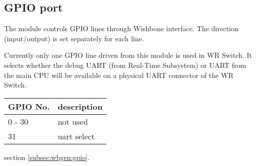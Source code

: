 \subsection{GPIO port}


The module controls GPIO lines through Wishbone interface. The direction
(input/output) is set separately for each line.

Currently only one GPIO line driven from this module is used in WR Switch. It
selects whether the debug UART (from Real-Time Subsystem) or UART from the main CPU
will be available on a physical UART connector of the WR Switch.\\

\begin{center}
\begin{tabular}{|l|l|}
  \hline
  GPIO No. & description\\
  \hline \hline
  0 - 30 & not used\\
      31 & uart select\\
  \hline
\end{tabular}
\end{center}

\vspace{12pt}
 section \ref{subsec:wbgen:gpio}.
